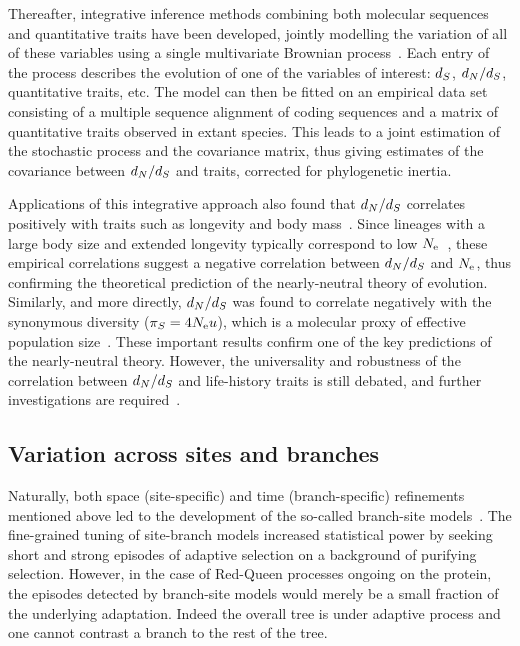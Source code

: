 Thereafter, integrative inference methods combining both molecular sequences and quantitative traits have been developed, jointly modelling the variation of all of these variables using a single multivariate Brownian process~\citep{Lartillot2011}.
Each entry of the process describes the evolution of one of the variables of interest: $d_S$, $d_N / d_S$, quantitative traits, etc.
The model can then be fitted on an empirical data set consisting of a multiple sequence alignment of coding sequences and a matrix of quantitative traits observed in extant species.
This leads to a joint estimation of the stochastic process and the covariance matrix, thus giving estimates of the covariance between $d_N / d_S$ and traits, corrected for phylogenetic inertia.

Applications of this integrative approach also found that $d_N / d_S$ correlates positively with traits such as longevity and body mass~\citep{Lartillot2011, Figuet2017}.
Since lineages with a large body size and extended longevity typically correspond to low $N_{\text{e}}$~\citep{Romiguier2014}, these empirical correlations suggest a negative correlation between $d_N / d_S$ and $N_{\text{e}}$, thus confirming the theoretical prediction of the nearly-neutral theory of evolution.
Similarly, and more directly, $d_N / d_S$ was found to correlate negatively with the synonymous diversity ($\pi_S = 4 N_{\text{e}} u$), which is a molecular proxy of effective population size~\citep{Brevet2019}.
These important results confirm one of the key predictions of the nearly-neutral theory.
However, the universality and robustness of the correlation between $d_N / d_S$ and life-history traits is still debated, and further investigations are required~\citep{Nabholz2013,Lanfear2014,Figuet2016, Bolivar2019}.

\subsection{Variation across sites and branches}
\label{subsec:variation-across-sites-and-branches}

Naturally, both space (site-specific) and time (branch-specific) refinements mentioned above led to the development of the so-called branch-site models~\citep{Yang2002a, Zhang2004, Pond2011, Murrell2012, Murrell2013}.
The fine-grained tuning of site-branch models increased statistical power by seeking short and strong episodes of adaptive selection on a background of purifying selection.
However, in the case of Red-Queen processes ongoing on the protein, the episodes detected by branch-site models would merely be a small fraction of the underlying adaptation.
Indeed the overall tree is under adaptive process and one cannot contrast a branch to the rest of the tree.


